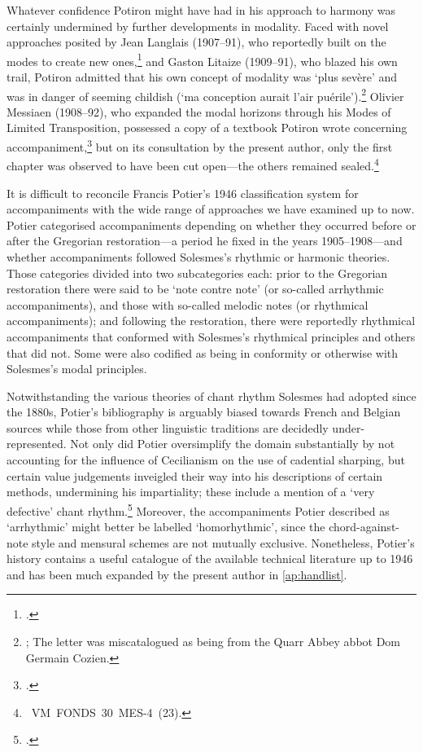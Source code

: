 Whatever confidence Potiron might have had in his approach to harmony was certainly undermined by further developments in modality.
Faced with novel approaches posited by Jean Langlais (1907--91), who reportedly built on the modes to create new ones,\footcite[78]{KrellwitzUseGregorianChant1981} and Gaston Litaize (1909--91), who blazed his own trail, Potiron admitted that his own concept of modality was `plus sevère' and was in danger of seeming childish (`ma conception aurait l'air puérile').\footnote{; The letter was miscatalogued as being from the Quarr Abbey abbot Dom Germain Cozien.}
Olivier Messiaen (1908--92), who expanded the modal horizons through his Modes of Limited Transposition, possessed a copy of a textbook Potiron wrote concerning accompaniment,\footcite{PotironLeconspratiquesaccompagnement1952} but on its consultation by the present author, only the first chapter was observed to have been cut open---the others remained sealed.\footnote{\bnf{}~VM~FONDS~30~MES-4~(23).}

%
It is difficult to reconcile Francis Potier's 1946 classification system for accompaniments with the wide range of approaches we have examined up to now.
Potier categorised accompaniments depending on whether they occurred before or after the Gregorian restoration---a period he fixed in the years 1905--1908---and whether accompaniments followed Solesmes's rhythmic or harmonic theories.
Those categories divided into two subcategories each: prior to the Gregorian restoration there were said to be `note contre note' (or so-called arrhythmic accompaniments), and those with so-called melodic notes (or rhythmical accompaniments); and following the restoration, there were reportedly rhythmical accompaniments that conformed with Solesmes's rhythmical principles and others that did not.
Some were also codified as being in conformity or otherwise with Solesmes's modal principles.
\nowidow[2]

Notwithstanding the various theories of chant rhythm Solesmes had adopted since the 1880s, Potier's bibliography is arguably biased towards French and Belgian sources while those from other linguistic traditions are decidedly under-represented.
Not only did Potier oversimplify the domain substantially by not accounting for the influence of Cecilianism on the use of cadential sharping, but certain value judgements inveigled their way into his descriptions of certain methods, undermining his impartiality; these include a mention of a `very defective' chant rhythm.\footcite[pp.~67, 92 \S{}115]{Potierartaccompagnementchant1946}
Moreover, the accompaniments Potier described as `arrhythmic' might better be labelled `homorhythmic', since the chord-against-note style and mensural schemes are not mutually exclusive.
Nonetheless, Potier's history contains a useful catalogue of the available technical literature up to 1946 and has been much expanded by the present author in \cref{ap:handlist}.
\noclub[2]

